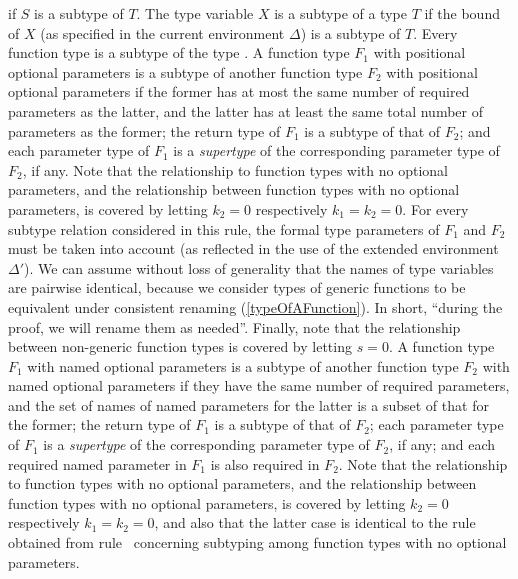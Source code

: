 \documentclass[makeidx]{article}
\begin{document}
{\begin{itemize}
  if $S$ is a subtype of $T$.
  The type variable $X$ is a subtype of a type $T$
  if the bound of $X$
  (as specified in the current environment $\Delta$)
  is a subtype of $T$.
  Every function type is a subtype of the type \FUNCTION.
  A function type $F_1$ with positional optional parameters
  is a subtype of
  another function type $F_2$ with positional optional parameters
  if the former has at most
  the same number of required parameters as the latter,
  and the latter has at least
  the same total number of parameters as the former;
  the return type of $F_1$ is a subtype of that of $F_2$;
  and each parameter type of $F_1$ is a \emph{supertype} of
  the corresponding parameter type of $F_2$, if any.
  Note that the relationship to function types with no optional parameters,
  and the relationship between function types with no optional parameters,
  is covered by letting $k_2 = 0$ respectively $k_1 = k_2 = 0$.
  For every subtype relation considered in this rule,
  the formal type parameters of $F_1$ and $F_2$ must be taken into account
  (as reflected in the use of the extended environment $\Delta'$).
  We can assume without loss of generality
  that the names of type variables are pairwise identical,
  because we consider types of generic functions to be equivalent under
  consistent renaming
  (\ref{typeOfAFunction}).
  In short, ``during the proof, we will rename them as needed''.
  Finally, note that the relationship between non-generic function types
  is covered by letting $s = 0$.
  A function type $F_1$ with named optional parameters is a subtype of
  another function type $F_2$ with named optional parameters
  if they have the same number of required parameters,
  and the set of names of named parameters for the latter is a subset
  of that for the former;
  the return type of $F_1$ is a subtype of that of $F_2$;
  each parameter type of $F_1$ is a \emph{supertype} of
  the corresponding parameter type of $F_2$, if any;
  and each required named parameter in $F_1$ is also required in $F_2$.
  Note that the relationship to function types with no optional parameters,
  and the relationship between function types with no optional parameters,
  is covered by letting $k_2 = 0$ respectively $k_1 = k_2 = 0$,
  and also that the latter case is identical to the rule obtained from
  rule~\SrnPositionalFunctionType{}
  concerning subtyping among function types with no optional parameters.

\end{itemize}}
\end{document}
